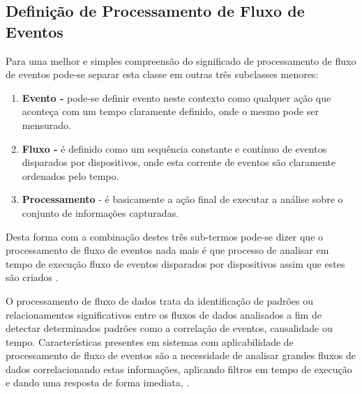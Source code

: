 \documentclass[ti,table]{texufpel} %
\begin{document}
\subsection{Definição de Processamento de Fluxo de Eventos}

Para uma melhor e simples compreensão do significado de processamento de fluxo de eventos pode-se separar esta classe em outras três subclasses menores:
\begin{enumerate}
	\item  \textbf{Evento -} pode-se definir evento neste contexto como qualquer ação que aconteça com um tempo claramente definido, onde o mesmo pode ser mensurado.  
	
	\item  \textbf{Fluxo -} é definido como um sequência constante e contínuo de eventos disparados por dispositivos, onde esta corrente de eventos são claramente ordenados pelo tempo.
	
	\item  \textbf{Processamento} - é basicamente a ação final de executar a análise sobre o conjunto de informações capturadas.
\end{enumerate}
Desta forma com a combinação destes três sub-termos pode-se dizer que o processamento de fluxo de eventos nada mais é que processo de analisar em tempo de execução fluxo de eventos disparados por dispositivos assim que estes são criados \cite{dayarathna2018recent}. 

O processamento de fluxo de dados trata da identificação de padrões ou relacionamentos significativos entre os fluxos de dados analisados a fim de detectar determinados padrões como a correlação de eventos, causalidade ou tempo.
Características presentes em sistemas com aplicabilidade de processamento de fluxo de eventos são a necessidade de analisar grandes fluxos de dados correlacionando estas informações, aplicando filtros em tempo de execução e dando uma resposta de forma imediata, \cite{appel2013event}.


\end{document}
